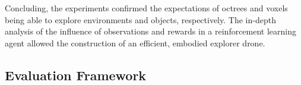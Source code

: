         Concluding, the experiments confirmed the expectations of octrees and voxels being able to explore environments and objects, respectively. The in-depth analysis of the influence of observations and rewards in a reinforcement learning agent allowed the construction of an efficient, embodied explorer drone.
        
        
        
        
        
        
        
        
        
        


    \subsection{Evaluation Framework}

